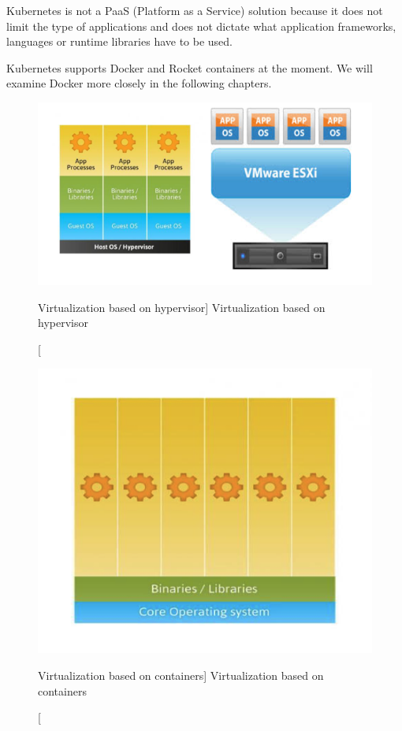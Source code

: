 Kubernetes is not a PaaS (Platform as a Service) solution because it does not limit the type of applications and does not dictate what application frameworks, languages or runtime libraries have to be used. 

Kubernetes supports Docker and Rocket \cite{rocket} containers at the moment. We will examine Docker more closely in the following chapters.

\begin{figure}[htb]\centering
  \includegraphics[width=1\textwidth]{images/virtualize-hyper.png}
  \caption
    [Virtualization based on hypervisor]
    {Virtualization based on hypervisor \cite{linuxcontainers}}
  \label{fig:virtualize-hyper}
\end{figure}

\begin{figure}[htb]\centering
  \includegraphics[width=1\textwidth]{images/virtualize-container.png}
  \caption
    [Virtualization based on containers]
    {Virtualization based on containers \cite{linuxcontainers}}
  \label{fig:virtualize-container}
\end{figure}
